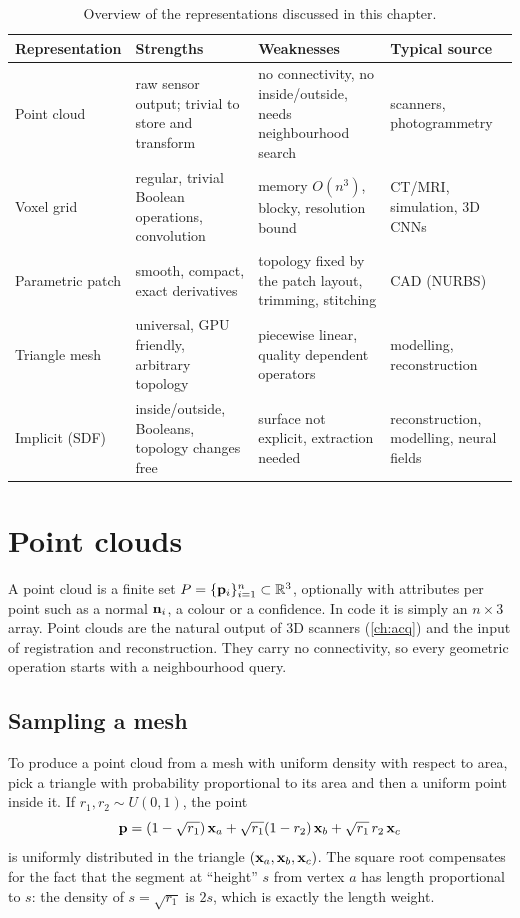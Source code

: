 \begin{table}[tbp]
\centering\small
\begin{tabularx}{\textwidth}{@{}lXXX@{}}
\toprule
Representation & Strengths & Weaknesses & Typical source \\
\midrule
Point cloud & raw sensor output; trivial to store and transform & no connectivity, no
inside/outside, needs neighbourhood search & scanners, photogrammetry \\
Voxel grid & regular, trivial Boolean operations, convolution & memory $O(n^3)$, blocky,
resolution bound & CT/MRI, simulation, 3D CNNs \\
Parametric patch & smooth, compact, exact derivatives & topology fixed by the patch layout,
trimming, stitching & CAD (NURBS) \\
Triangle mesh & universal, GPU friendly, arbitrary topology & piecewise linear, quality
dependent operators & modelling, reconstruction \\
Implicit (SDF) & inside/outside, Booleans, topology changes free & surface not explicit,
extraction needed & reconstruction, modelling, neural fields \\
\bottomrule
\end{tabularx}
\caption{Overview of the representations discussed in this chapter.}
\label{tab:repr}
\end{table}

\section{Point clouds}\label{sec:pointclouds}

A point cloud is a finite set $P=\{\mathbf{p}_i\}_{i=1}^n\subset\mathbb{R}^3$, optionally with attributes per
point such as a normal $\mathbf{n}_i$, a colour or a confidence. In code it is simply an $n\times 3$ array.
Point clouds are the natural output of 3D scanners (\cref{ch:acq}) and the input of registration
and reconstruction. They carry no connectivity, so every geometric operation starts with a
neighbourhood query.

\subsection{Sampling a mesh}

To produce a point cloud from a mesh with uniform density with respect to area, pick a triangle
with probability proportional to its area and then a uniform point inside it. If $r_1,r_2\sim
U(0,1)$, the point
\begin{equation}
\mathbf{p}=(1-\sqrt{r_1})\,\mathbf{x}_a+\sqrt{r_1}(1-r_2)\,\mathbf{x}_b+\sqrt{r_1}\,r_2\,\mathbf{x}_c
\label{eq:triangle-sampling}
\end{equation}
is uniformly distributed in the triangle $(\mathbf{x}_a,\mathbf{x}_b,\mathbf{x}_c)$. The square root compensates for the
fact that the segment at ``height'' $s$ from vertex $a$ has length proportional to $s$: the
density of $s=\sqrt{r_1}$ is $2s$, which is exactly the length weight.

